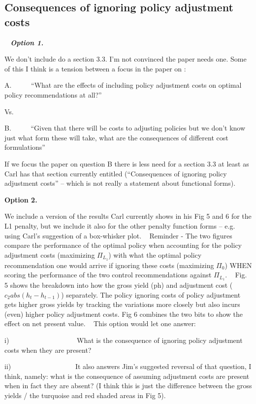 \documentclass[authoryear, review, 12pt]{elsarticle}
\newcommand{\pa}[1]{{\it \color{darkblue} #1}}
\begin{document}
\subsection{Consequences of ignoring policy adjustment costs}

\pa{
   
  \textbf{Option 1.}

  We don’t include do a section 3.3. I’m not convinced the paper needs one. Some of this I think is a tension between a focus in the paper on :

  A.      ``What are the effects of including policy adjustment costs on optimal policy recommendations at all?''

  Vs.

  B.      ``Given that there will be costs to adjusting policies but we don’t know just what form these will take, what are the consequences of different cost formulations''



  If we focus the paper on question B there is less need for a section 3.3 at least as Carl has that section currently entitled (``Consequences of ignoring policy adjustment costs'' – which is not really a statement about functional forms).
   

  \textbf{Option 2.}

  We include a version of the results Carl currently shows in his Fig 5 and 6 for the L1 penalty, but we include it also for the other penalty function forms – e.g. using Carl’s suggestion of a box-whisker plot.
   
  Reminder - The two figures compare the performance of the optimal policy when accounting for the policy adjustment costs (maximizing $\Pi_{L_1}$) with what the optimal policy recommendation one would arrive if ignoring these costs (maximizing $\Pi_0$) WHEN scoring the performance of the two control recommendations against $\Pi_{L_1}$.
   
  Fig. 5 shows the breakdown into how the gross yield (ph) and adjustment cost ($c_2 abs(h_t-h_{t-1})$) separately. The policy ignoring costs of policy adjustment gets higher gross yields by tracking the variations more closely but also incurs (even) higher policy adjustment costs. Fig 6 combines the two bits to show the effect on net present value.
   
  This option would let one answer:

  i)                    What is the consequence of ignoring policy adjustment costs when they are present?

  ii)                   It also answers Jim’s suggested reversal of that question, I think, namely: what is the consequence of assuming adjustment costs are present when in fact they are absent? (I think this is just the difference between the gross yields / the turquoise and red shaded areas in Fig 5).

}
\end{document}
